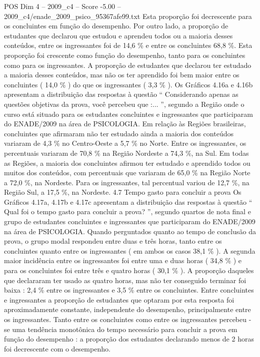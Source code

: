 \begin{textsample}{POS Dim 4 – 2009\_c4 – Score -5.00 – 2009\_c4/enade\_2009\_psico\_95367afe99.txt}
Esta proporção foi decrescente para os concluintes em função do desempenho.
Por outro lado, a proporção de estudantes que declarou que estudou e aprendeu todos ou a maioria desses conteúdos, entre os ingressantes foi de 14,6 \% e entre os concluintes 68,8 \%.
Esta proporção foi crescente como função do desempenho, tanto para os concluintes como para os ingressantes.
A proporção de estudantes que declarou ter estudado a maioria desses conteúdos, mas não os ter aprendido foi bem maior entre os concluintes ( 14,0 \% ) do que os ingressantes ( 3,3 \% ).
Os Gráficos 4.16a e 4.16b apresentam a distribuição das respostas à questão “ Considerando apenas as questões objetivas da prova, você percebeu que :... ”, segundo a Região onde o curso está situado para os estudantes concluintes e ingressantes que participaram do ENADE/2009 na área de PSICOLOGIA.
Em relação às Regiões brasileiras, concluintes que afirmaram não ter estudado ainda a maioria dos conteúdos variaram de 4,3 \% no Centro-Oeste a 5,7 \% no Norte.
Entre os ingressantes, os percentuais variaram de 70,8 \% na Região Nordeste a 74,3 \%, na Sul.
Em todas as Regiões, a maioria dos concluintes afirmou ter estudado e aprendido todos ou muitos dos conteúdos, com percentuais que variaram de 65,0 \% na Região Norte a 72,0 \%, na Nordeste.
Para os ingressantes, tal percentual variou de 12,7 \%, na Região Sul, a 17,5 \%, na Nordeste. 4.7 Tempo gasto para concluir a prova Os Gráficos 4.17a, 4.17b e 4.17c apresentam a distribuição das respostas à questão “ Qual foi o tempo gasto para concluir a prova? ”, segundo quartos de nota final e grupo de estudantes concluintes e ingressantes que participaram do ENADE/2009 na área de PSICOLOGIA.
Quando perguntados quanto ao tempo de conclusão da prova, o grupo modal respondeu entre duas e três horas, tanto entre os concluintes quanto entre os ingressantes ( em ambos os casos 38,1 \% ).
A segunda maior incidência entre os ingressantes foi entre uma e duas horas ( 34,8 \% ) e para os concluintes foi entre três e quatro horas ( 30,1 \% ).
A proporção daqueles que declararam ter usado as quatro horas, mas não ter conseguido terminar foi baixa : 2,4 \% entre os ingressantes e 3,5 \% entre os concluintes.
Entre concluintes e ingressantes a proporção de estudantes que optaram por esta resposta foi aproximadamente constante, independente do desempenho, principalmente entre os ingressantes.
Tanto entre os concluintes como entre os ingressantes percebeu -se uma tendência monotônica do tempo necessário para concluir a prova em função do desempenho : a proporção dos estudantes declarando menos de 2 horas foi decrescente com o desempenho.

\end{textsample}
